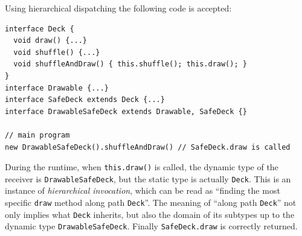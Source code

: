 Using hierarchical dispatching the following code is accepted:
\vspace{3pt}\begin{lstlisting}
interface Deck {
  void draw() {...}
  void shuffle() {...}
  void shuffleAndDraw() { this.shuffle(); this.draw(); }
}
interface Drawable {...}
interface SafeDeck extends Deck {...}
interface DrawableSafeDeck extends Drawable, SafeDeck {}

// main program
new DrawableSafeDeck().shuffleAndDraw() // SafeDeck.draw is called
\end{lstlisting}\vspace{3pt}
During the runtime, when \lstinline|this.draw()| is called,
the dynamic type of the receiver is \lstinline|DrawableSafeDeck|, but the static type is actually
\lstinline|Deck|. This is an instance of \textit{hierarchical invocation}, which can be read as 
``finding the most specific \lstinline|draw| method along path \lstinline|Deck|''. The meaning of ``along path
\lstinline|Deck|'' not only implies what \lstinline|Deck| inherits, but also the domain of its subtypes up to the
dynamic type \lstinline|DrawableSafeDeck|. Finally \lstinline|SafeDeck.draw| is correctly returned.

